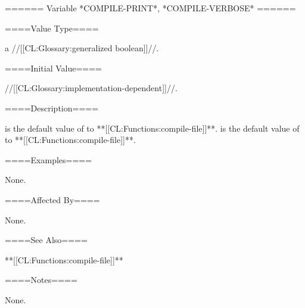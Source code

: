 ====== Variable *COMPILE-PRINT*, *COMPILE-VERBOSE* ======

====Value Type====

a //[[CL:Glossary:generalized boolean]]//.

====Initial Value====

//[[CL:Glossary:implementation-dependent]]//.

====Description====

 is the default value of  to **[[CL:Functions:compile-file]]**.  is the default value of  to **[[CL:Functions:compile-file]]**.

====Examples====

None.

====Affected By====

None.

====See Also====

**[[CL:Functions:compile-file]]**

====Notes====

None.


